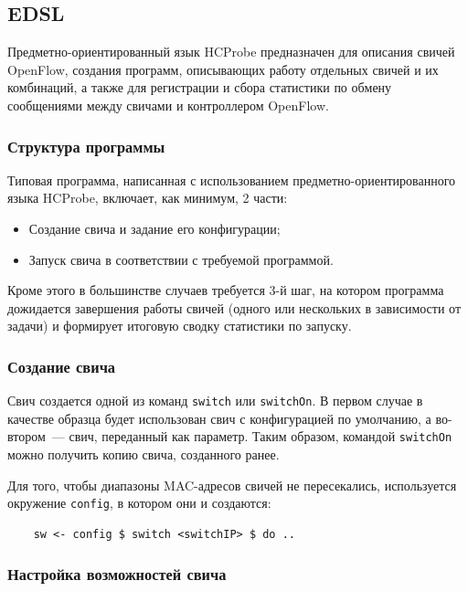 \documentclass[9pt,a4paper]{article}
\begin{document}
\subsection{EDSL}

Предметно-ориентированный язык HCProbe предназначен для описания свичей
OpenFlow, создания программ, описывающих работу отдельных свичей и их
комбинаций, а также для регистрации и сбора статистики по обмену сообщениями
между свичами и контроллером OpenFlow.

\subsubsection{Структура программы}

Типовая программа, написанная с использованием предметно-ориентированного языка
HCProbe, включает, как минимум, 2 части:

\begin{itemize}
  \item Создание свича и задание его конфигурации;
  \item Запуск свича в соответствии с требуемой программой.
\end{itemize}

Кроме этого в большинстве случаев требуется 3-й шаг, на котором программа
дожидается завершения работы свичей (одного или нескольких в зависимости от
задачи) и формирует итоговую сводку статистики по запуску.

\subsubsection{Создание свича}

Свич создается одной из команд \lstinline!switch! или \lstinline!switchOn!. В
первом случае в качестве образца будет использован свич с конфигурацией по
умолчанию, а во-втором~--- свич, переданный как параметр. Таким образом, командой
\lstinline!switchOn! можно получить копию свича, созданного ранее.

Для того, чтобы диапазоны MAC-адресов свичей не пересекались, используется окружение
\lstinline!config!, в котором они и создаются:

\begin{lstlisting}
    sw <- config $ switch <switchIP> $ do ..
\end{lstlisting}%

\subsubsection{Настройка возможностей свича}
\end{document}
